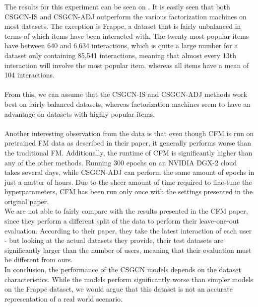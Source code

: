 The results for this experiment can be seen on .
It is easily seen that both CSGCN-IS and CSGCN-ADJ outperform the various factorization machines on most datasets.
The exception is Frappe, a dataset that is fairly unbalanced in terms of which items have been interacted with. 
The twenty most popular items have between 640 and 6,634 interactions, which is quite a large number for a dataset only containing 85,541 interactions, meaning that almost every 13th interaction will involve the most popular item, whereas all items have a mean of 104 interactions.\\\\
From this, we can assume that the CSGCN-IS and CSGCN-ADJ methods work best on fairly balanced datasets, whereas factorization machines seem to have an advantage on datasets with highly popular items.\\\\
Another interesting observation from the data is that even though CFM is run on pretrained FM data as described in their paper, it generally performs worse than the traditional FM.
Additionally, the runtime of CFM is significantly higher than any of the other methods.
Running 300 epochs on an NVIDIA DGX-2 cloud takes several days, while CSGCN-ADJ can perform the same amount of epochs in just a matter of hours.
Due to the sheer amount of time required to fine-tune the hyperparameters, CFM has been run only once with the settings presented in the original paper.\\
We are not able to fairly compare with the results presented in the CFM paper, since they perform a different split of the data to perform their leave-one-out evaluation.
According to their paper, they take the latest interaction of each user - but looking at the actual datasets they provide, their test datasets are significantly larger than the number of users, meaning that their evaluation must be different from ours.
\\
In conclusion, the performance of the CSGCN models depends on the dataset characteristics.
While the models perform significantly worse than simpler models on the Frappe dataset, we would argue that this dataset is not an accurate representation of a real world scenario.


